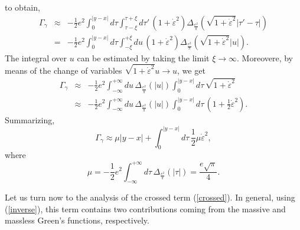 \documentclass[a4paper,12pt]{article}
\begin{document}
to obtain,
\begin{eqnarray}
\Gamma_\gamma &\approx & -\frac{1}{2}e^2\int_0^{|y-x|} d\tau \int_{\tau-\xi}^{\tau+\xi} d\tau' \, \left( 1+ \dot{\varepsilon}^2\right)
\Delta_{\frac{e^2}{\pi}}\left(\sqrt{1+\dot{\varepsilon}^2}|\tau'-\tau|  \right)\nonumber \\
&=& -\frac{1}{2}e^2\int_0^{|y-x|} d\tau \int_{-\xi}^{+\xi} du \, \left( 1+ \dot{\varepsilon}^2\right)
\Delta_{\frac{e^2}{\pi}}\left(\sqrt{1+\dot{\varepsilon}^2}|u|  \right).
\end{eqnarray}
The integral over $u$ can be estimated by taking the limit $\xi \to \infty$. Moreovere, by means of the change of variables $ \sqrt{1+\dot{\varepsilon}^2}u \rightarrow u$, we get 
\begin{eqnarray}
\Gamma_\gamma &\approx& -\frac{1}{2}e^2\int_{-\infty}^{+\infty} du \, 
\Delta_{\frac{e^2}{\pi}}\left(|u| \right)\int_0^{|y-x|} d\tau\, 
\sqrt{ 1+ \dot{\varepsilon}^2}\nonumber \\
&\approx& -\frac{1}{2}e^2\int_{-\infty}^{+\infty} du \, 
\Delta_{\frac{e^2}{\pi}}\left(|u| \right)\int_0^{|y-x|} d\tau\, 
\left( 1+ \frac{1}{2}\dot{\varepsilon}^2\right).
\end{eqnarray}
Summarizing, 
\begin{equation}
\Gamma_\gamma \approx \mu |y-x| + \int_0^{|y-x|} d\tau\, \frac{1}{2}\mu \dot{\varepsilon}^2,
\label{gammaction}
\end{equation}
where
\begin{equation}
\mu=-\frac{1}{2}e^2\int_{-\infty}^{+\infty} d\tau\, \Delta_{\frac{e^2}{\pi}}
(|\tau|)=\frac{e\sqrt{\pi}}{4}.
\end{equation}

Let us turn now to the analysis of the crossed term (\ref{crossed}). In general, using (\ref{inverse}), this term contains two contributions coming from the massive and massless Green's functions, respectively.
 
\end{document}
